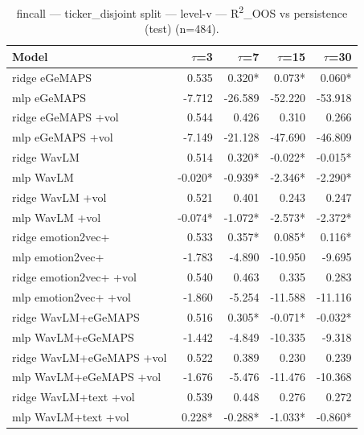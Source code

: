 \begin{table}[t]
\centering
\begin{tabular}{lrrrr}
\toprule
Model & $\tau$=3 & $\tau$=7 & $\tau$=15 & $\tau$=30 \\
\midrule
ridge eGeMAPS & 0.535 & 0.320* & 0.073* & 0.060* \\
mlp eGeMAPS & -7.712 & -26.589 & -52.220 & -53.918 \\
ridge eGeMAPS +vol & 0.544 & 0.426 & 0.310 & 0.266 \\
mlp eGeMAPS +vol & -7.149 & -21.128 & -47.690 & -46.809 \\
ridge WavLM & 0.514 & 0.320* & -0.022* & -0.015* \\
mlp WavLM & -0.020* & -0.939* & -2.346* & -2.290* \\
ridge WavLM +vol & 0.521 & 0.401 & 0.243 & 0.247 \\
mlp WavLM +vol & -0.074* & -1.072* & -2.573* & -2.372* \\
ridge emotion2vec+ & 0.533 & 0.357* & 0.085* & 0.116* \\
mlp emotion2vec+ & -1.783 & -4.890 & -10.950 & -9.695 \\
ridge emotion2vec+ +vol & 0.540 & 0.463 & 0.335 & 0.283 \\
mlp emotion2vec+ +vol & -1.860 & -5.254 & -11.588 & -11.116 \\
ridge WavLM+eGeMAPS & 0.516 & 0.305* & -0.071* & -0.032* \\
mlp WavLM+eGeMAPS & -1.442 & -4.849 & -10.335 & -9.318 \\
ridge WavLM+eGeMAPS +vol & 0.522 & 0.389 & 0.230 & 0.239 \\
mlp WavLM+eGeMAPS +vol & -1.676 & -5.476 & -11.476 & -10.368 \\
ridge WavLM+text +vol & 0.539 & 0.448 & 0.276 & 0.272 \\
mlp WavLM+text +vol & 0.228* & -0.288* & -1.033* & -0.860* \\
\bottomrule
\end{tabular}
\caption{fincall — ticker\_disjoint split — level-v — R\textsuperscript{2}\_OOS vs persistence (test) (n=484).}
\end{table}

